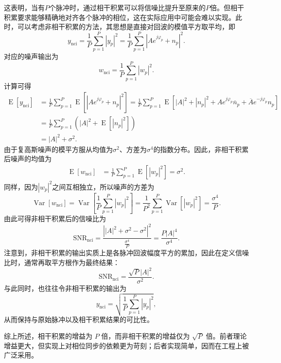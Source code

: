 这表明，当有\( P \)个脉冲时，通过相干积累可以将信噪比提升至原来的\( P \)倍。但相干积累要求能够精确地对齐各个脉冲的相位，这在实际应用中可能会难以实现。此时，可以考虑非相干积累的方法，其思想是直接对回波的模值平方取平均，即
\[
    y_{\mathrm{nci}} = \frac{1}{P} \sum_{p=1}^P |y_p|^2 = \frac{1}{P} \sum_{p=1}^P \left| A e^{j \varphi_p} + n_p \right|^2.
\]
对应的噪声输出为
\[
    w_{\mathrm{nci}} = \frac{1}{P} \sum_{p=1}^P |w_p|^2.
\]
计算可得
\[
    \begin{split}
        \operatorname{E}[y_{\mathrm{nci}}] & = \frac{1}{P} \sum_{p=1}^P \operatorname{E}\left[ |A e^{j \varphi_p} + n_p|^2 \right] = \frac{1}{P} \sum_{p=1}^P \operatorname{E} \left[ |A|^2 + |n_p|^2 + A e^{j \varphi_p} \overline{n}_p + \overline{A} e^{-j \varphi_p} n_p \right] \\
                                           & = \frac{1}{P} \sum_{p=1}^P \left( |A|^2 + \operatorname{E}[|n_p|^2] \right)                                                                                                                                                             \\
                                           & = |A|^2 + \sigma^2.
    \end{split}
\]
由于复高斯噪声的模平方服从均值为\( \sigma^2 \)、方差为\( \sigma^4 \)的指数分布。因此，非相干积累后噪声的均值为
\[
    \begin{split}
        \operatorname{E}[w_{\mathrm{nci}}] & =\frac{1}{P}  \sum_{p=1}^P \operatorname{E}\left[ |w_p|^2 \right] = \sigma^2.
    \end{split}
\]
同样，因为\( |w_p|^2 \)之间互相独立，所以噪声的方差为
\[
    \operatorname{Var}[w_{\mathrm{nci}}] = \operatorname{Var}\left[ \frac{1}{P} \sum_{p=1}^P |w_p|^2\right] = \frac{1}{P^2}\sum_{p=1}^P \operatorname{Var}\left[ |w_p|^2\right] = \frac{\sigma^4}{P}.
\]
由此可得非相干积累后的信噪比为
\[
    \mathrm{SNR}_{\mathrm{nci}} = \frac{\left||A|^2 + \sigma^2 - \sigma^2\right|^2}{\frac{\sigma^4}{P}} = \frac{P |A|^4}{\sigma^4}.
\]
注意到，非相干积累的输出实质上是各脉冲回波幅度平方的累加，因此在定义信噪比时，通常再取平方根作为最终结果：
\[
    \mathrm{SNR}_{\mathrm{nci}} = \frac{\sqrt{P} |A|^2}{\sigma^2}.
\]
与此同时，也往往令非相干积累的输出为
\[
    y_{\mathrm{nci}} = \sqrt{\frac{1}{P} \sum_{p=1}^P |y_p|^2},
\]
从而保持与原始脉冲以及相干积累结果的可比性。

综上所述，相干积累的增益为 \( P \) 倍，而非相干积累的增益仅为 \(\sqrt{P}\) 倍。前者理论增益更大，但实现上对相位同步的依赖更为苛刻；后者实现简单，因而在工程上被广泛采用。

